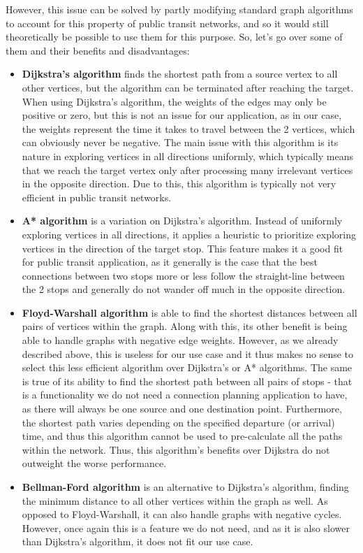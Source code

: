 However, this issue can be solved by partly modifying standard graph algorithms to account for this property of public transit networks, and so it would still theoretically be possible to use them for this purpose. So, let's go over some of them and their benefits and disadvantages:

\begin{itemize}
    \item \textbf{Dijkstra's algorithm} finds the shortest path from a source vertex to all other vertices, but the algorithm can be terminated after reaching the target. When using Dijkstra's algorithm, the weights of the edges may only be positive or zero, but this is not an issue for our application, as in our case, the weights represent the time it takes to travel between the 2 vertices, which can obviously never be negative. The main issue with this algorithm is its nature in exploring vertices in all directions uniformly, which typically means that we reach the target vertex only after processing many irrelevant vertices in the opposite direction. Due to this, this algorithm is typically not very efficient in public transit networks.

    \item \textbf{A* algorithm} is a variation on Dijkstra's algorithm. Instead of uniformly exploring vertices in all directions, it applies a heuristic to prioritize exploring vertices in the direction of the target stop. This feature makes it a good fit for public transit application, as it generally is the case that the best connections between two stops more or less follow the straight-line between the 2 stops and generally do not wander off much in the opposite direction.

    \item \textbf{Floyd-Warshall algorithm} is able to find the shortest distances between all pairs of vertices within the graph. Along with this, its other benefit is being able to handle graphs with negative edge weights. However, as we already described above, this is useless for our use case and it thus makes no sense to select this less efficient algorithm over Dijkstra's or A* algorithms. The same is true of its ability to find the shortest path between all pairs of stops - that is a functionality we do not need a connection planning application to have, as there will always be one source and one destination point. Furthermore, the shortest path varies depending on the specified departure (or arrival) time, and thus this algorithm cannot be used to pre-calculate all the paths within the network. Thus, this algorithm's benefits over Dijkstra do not outweight the worse performance.
    
    \item \textbf{Bellman-Ford algorithm} is an alternative to Dijkstra's algorithm, finding the minimum distance to all other vertices within the graph as well. As opposed to Floyd-Warshall, it can also handle graphs with negative cycles. However, once again this is a feature we do not need, and as it is also slower than Dijkstra's algorithm, it does not fit our use case.
\end{itemize}

